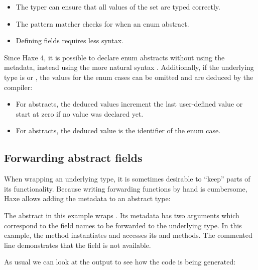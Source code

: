 \begin{itemize}
	\item The typer can ensure that all values of the set are typed correctly.
	\item The pattern matcher checks for  when  an enum abstract.
	\item Defining fields requires less syntax.
\end{itemize}


Since Haxe 4, it is possible to declare enum abstracts without using the  metadata, instead using the more natural syntax . Additionally, if the underlying type is  or , the values for the enum cases can be omitted and are deduced by the compiler:

\begin{itemize}
	\item For  abstracts, the deduced values increment the last user-defined value or start at zero if no value was declared yet.
	\item For  abstracts, the deduced value is the identifier of the enum case.
\end{itemize}



\subsection{Forwarding abstract fields}
\label{types-abstract-forward}

When wrapping an underlying type, it is sometimes desirable to ``keep'' parts of its functionality. Because writing forwarding functions by hand is cumbersome, Haxe allows adding the  metadata to an abstract type:


The  abstract in this example wraps . Its  metadata has two arguments which correspond to the field names to be forwarded to the underlying type. In this example, the  method instantiates  and accesses its  and  methods. The commented line demonstrates that the  field is not available.

As usual we can look at the  output to see how the code is being generated:


